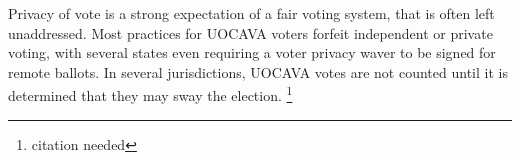 Privacy of vote is a strong expectation of a fair voting system, that is often
left unaddressed. Most practices for UOCAVA voters forfeit independent or
private voting, with several states even requiring a voter privacy waver to be
signed for remote ballots. In several jurisdictions, UOCAVA votes are not
counted until it is determined that they may sway the election.
\footnote{citation needed}

